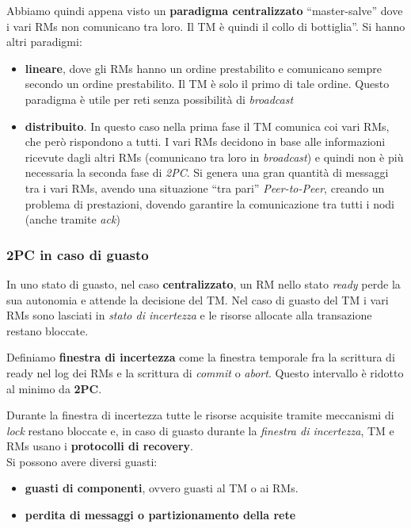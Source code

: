 \documentclass[a4paper,12pt, oneside]{book}
\begin{document}
Abbiamo quindi appena visto un \textbf{paradigma centralizzato} ``master-salve''
dove i vari RMs non comunicano tra loro. Il TM è quindi il collo di bottiglia''.
Si hanno altri paradigmi:
\begin{itemize}
  \item \textbf{lineare}, dove gli RMs hanno un ordine prestabilito e comunicano
  sempre secondo un ordine prestabilito. Il TM
  è solo il primo di tale ordine. Questo paradigma è utile per reti senza
  possibilità di \textit{broadcast}
  \item \textbf{distribuito}. In questo caso nella prima fase il TM comunica coi
  vari RMs, che però rispondono a tutti. I vari RMs decidono in base alle
  informazioni ricevute dagli altri RMs (comunicano tra loro in
  \textit{broadcast}) e quindi non è più necessaria la seconda fase di
  \textit{2PC}. Si genera una gran quantità di messaggi tra i vari RMs, avendo
  una situazione ``tra pari'' \textit{Peer-to-Peer}, creando un problema di
  prestazioni, dovendo garantire la comunicazione tra tutti i nodi (anche
  tramite \textit{ack})
\end{itemize}
\subsubsection{2PC in caso di guasto}
In uno stato di guasto, nel caso \textbf{centralizzato}, un RM nello stato
\textit{ready} perde la sua autonomia e attende la decisione del TM. Nel caso di
guasto del TM i vari RMs sono lasciati in \textit{stato di incertezza} e le
risorse allocate alla transazione restano bloccate.
\begin{definizione}
  Definiamo \textbf{finestra di incertezza} come la finestra temporale fra la
  scrittura di ready nel log dei RMs e la scrittura di \emph{commit} o
  \emph{abort}. Questo intervallo è ridotto al minimo da \textbf{2PC}.
\end{definizione}
Durante la finestra di incertezza tutte le risorse acquisite tramite meccanismi
di \textit{lock} restano bloccate e, in caso di guasto durante la
\textit{finestra di incertezza}, TM e RMs usano i \textbf{protocolli di
  recovery}.\\
Si possono avere diversi guasti:
\begin{itemize}
  \item \textbf{guasti di componenti}, ovvero guasti al TM o ai RMs.
  \item \textbf{perdita di messaggi o partizionamento della rete}
\end{itemize}
\end{document}
